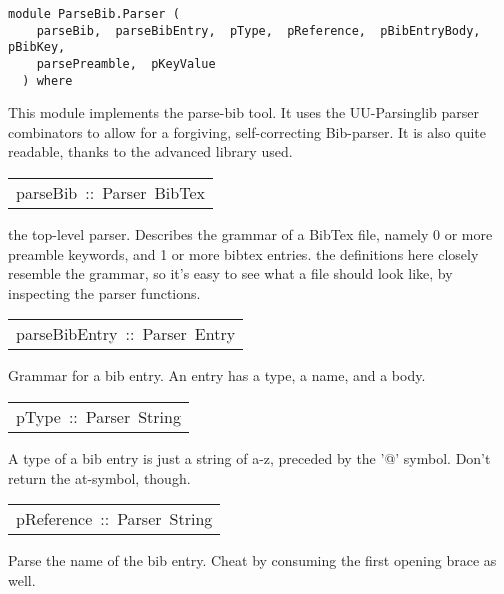 \label{module:ParseBib.Parser}
\haddockbeginheader
{\haddockverb\begin{verbatim}
module ParseBib.Parser (
    parseBib,  parseBibEntry,  pType,  pReference,  pBibEntryBody,  pBibKey, 
    parsePreamble,  pKeyValue
  ) where\end{verbatim}}
\haddockendheader

This module implements the parse-bib tool. It uses the UU-Parsinglib parser combinators
 to allow for a forgiving, self-correcting Bib-parser. It is also quite readable, thanks to the advanced
 library used. 
\par

\begin{haddockdesc}
\item[\begin{tabular}{@{}l}
parseBib\ ::\ Parser\ BibTex
\end{tabular}]\haddockbegindoc
the top-level parser. Describes the grammar of a BibTex file, 
 namely 0 or more preamble keywords, and 1 or more bibtex entries. the definitions
 here closely resemble the grammar, so it's easy to see what a file should look like, 
 by inspecting the parser functions. 
\par

\end{haddockdesc}
\begin{haddockdesc}
\item[\begin{tabular}{@{}l}
parseBibEntry\ ::\ Parser\ Entry
\end{tabular}]\haddockbegindoc
Grammar for a bib entry. An entry has a type, a name, and a body. 
\par

\end{haddockdesc}
\begin{haddockdesc}
\item[\begin{tabular}{@{}l}
pType\ ::\ Parser\ String
\end{tabular}]\haddockbegindoc
A type of a bib entry is just a string of a-z, preceded by the '@' symbol. 
 Don't return the at-symbol, though.
\par

\end{haddockdesc}
\begin{haddockdesc}
\item[\begin{tabular}{@{}l}
pReference\ ::\ Parser\ String
\end{tabular}]\haddockbegindoc
Parse the name of the bib entry. Cheat by consuming the first opening brace as well.
\par

\end{haddockdesc}
